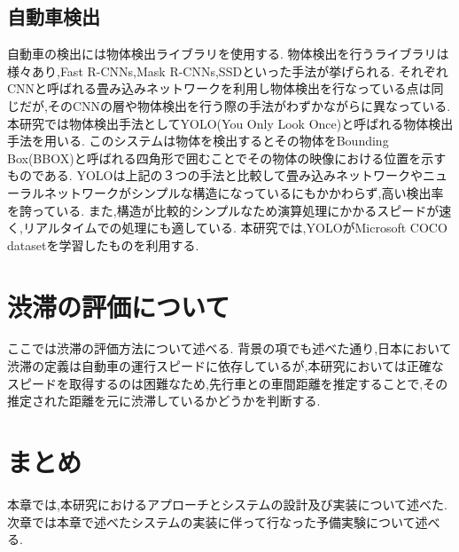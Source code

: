 \subsection{自動車検出}
自動車の検出には物体検出ライブラリを使用する.
物体検出を行うライブラリは様々あり,Fast R-CNNs,Mask R-CNNs,SSDといった手法が挙げられる.
それぞれCNNと呼ばれる畳み込みネットワークを利用し物体検出を行なっている点は同じだが,そのCNNの層や物体検出を行う際の手法がわずかながらに異なっている.
本研究では物体検出手法としてYOLO(You Only Look Once)と呼ばれる物体検出手法を用いる.
このシステムは物体を検出するとその物体をBounding Box(BBOX)と呼ばれる四角形で囲むことでその物体の映像における位置を示すものである.
YOLOは上記の３つの手法と比較して畳み込みネットワークやニューラルネットワークがシンプルな構造になっているにもかかわらず,高い検出率を誇っている.
また,構造が比較的シンプルなため演算処理にかかるスピードが速く,リアルタイムでの処理にも適している.
本研究では,YOLOがMicrosoft COCO datasetを学習したものを利用する.



\section{渋滞の評価について}
ここでは渋滞の評価方法について述べる.
背景の項でも述べた通り,日本において渋滞の定義は自動車の運行スピードに依存しているが,本研究においては正確なスピードを取得するのは困難なため,先行車との車間距離を推定することで,その推定された距離を元に渋滞しているかどうかを判断する.

\section{まとめ}
本章では,本研究におけるアプローチとシステムの設計及び実装について述べた.
次章では本章で述べたシステムの実装に伴って行なった予備実験について述べる.